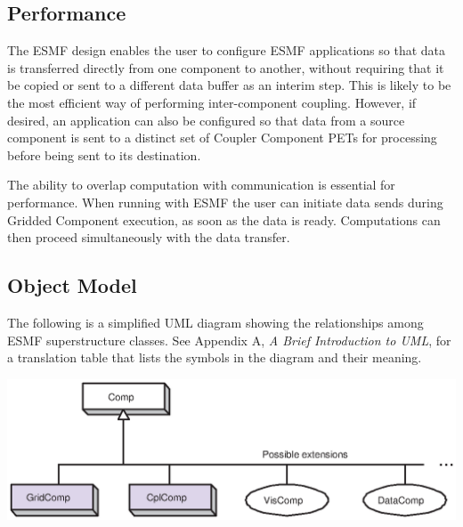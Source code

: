 \subsection{Performance}
\label{sec:performance}

The ESMF design enables the user to configure ESMF
applications so that data is transferred directly from one component 
to another, without requiring that it be copied or sent to a different data
buffer as an interim step.  This is likely to be the most efficient way 
of performing inter-component coupling.  However, if desired, an 
application can also be configured so that data from a source component 
is sent to a distinct set of Coupler Component PETs for processing 
before being sent to its destination.

The ability to overlap computation with communication is essential for
performance.  When running with ESMF the user can initiate data 
sends during Gridded Component execution, as soon as the data is ready.
Computations can then proceed simultaneously with the data transfer.

\newpage
\subsection{Object Model}

The following is a simplified UML diagram showing the relationships among
ESMF superstructure classes.  See Appendix A, {\it A Brief Introduction 
to UML}, for a translation table that lists the symbols in the diagram 
and their meaning.

\begin{center}
\includegraphics{Comp_obj}   
\end{center}



